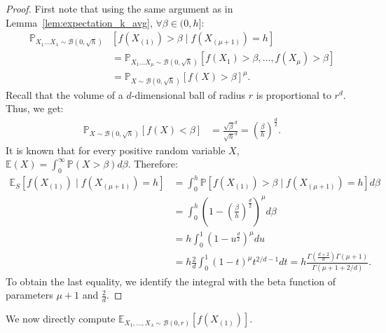 \begin{proof}
First note that using the same argument as in Lemma~\ref{lem:expectation_k_avg}, $\forall\beta\in (0,h]$:
\begin{align*}
\mathbb{P}_{X_{1}\ldots X_{\lambda}\sim\mathcal{B}(0,\sqrt{h})}&\left[f\left(X_{(1)}\right)>\beta\mid f(X_{(\mu+1)})=h\right]\\
&=\mathbb{P}_{X_{1}\ldots X_{\mu}\sim\mathcal{B}(0,\sqrt{h})}\left[f\left(X_{1}\right)>\beta,\ldots,f\left(X_{\mu}\right)>\beta\right]\\
 & =\mathbb{P}_{X\sim\mathcal{B}(0,\sqrt{h})}\left[f\left(X\right)>\beta\right]^{\mu}.
\end{align*}
Recall that the volume of a $d$-dimensional ball of radius $r$ is
proportional to $r^{d}$. Thus, we get:%
\begin{align*}
\mathbb{P}_{X\sim\mathcal{B}(0,\sqrt{h})}\left[f\left(X\right)<\beta\right] & =\frac{\sqrt{\beta}^{d}}{\sqrt{h}^{d}}=\left(\frac{\beta}{h}\right)^{\frac{d}{2}}.
\end{align*}
It is known that for every positive random variable $X$, $\mathbb{E}(X)=\int_0^\infty\mathbb{P}(X>\beta)d\beta$. Therefore:
\begin{align*}
\mathbb{E}_{S}\left[f\left(X_{(1)}\right)\mid f(X_{(\mu+1)})=h\right] &=\int_0^h \mathbb{P}\left[f\left(X_{(1)}\right)>\beta\mid f(X_{(\mu+1)})=h\right]d\beta\\
&=\int_0^h \left(1-\left(\frac{\beta}{h}\right)^{\frac{d}{2}}\right)^{\mu}d\beta\\
&=h\int_0^1 \left(1-u^{\frac{d}{2}}\right)^{\mu}du\\
&=h\frac2d \int_0^1 \left(1-t\right)^{\mu} t^{2/d-1}dt
= h \frac{\Gamma(\frac{d+2}{d})\Gamma(\mu+1)}{\Gamma(\mu+1+2/d)}.
\end{align*}
To obtain the last equality, we identify the integral with the beta function of parameters $\mu+1$ and $\frac2d$.%
\end{proof}
We now directly compute $\mathbb{E}_{X_1,...,X_\lambda\sim\mathcal{B}(0,r)}\left[ f(X_{(1)})\right]$.
